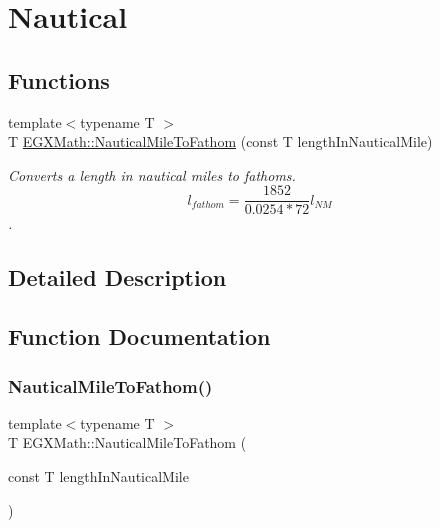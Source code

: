 \hypertarget{group___e_g_x_math-_conversions-_length_conversions-_nautical-_nautical_mile-_nautical}{}\section{Nautical}
\label{group___e_g_x_math-_conversions-_length_conversions-_nautical-_nautical_mile-_nautical}
\subsection*{Functions}
\begin{DoxyCompactItemize}
\item 
{\footnotesize template$<$typename T $>$ }\\T \mbox{\hyperlink{group___e_g_x_math-_conversions-_length_conversions-_nautical-_nautical_mile-_nautical_ga637330d41d3e33c1cf81ebe03e538bb3}{E\+G\+X\+Math\+::\+Nautical\+Mile\+To\+Fathom}} (const T length\+In\+Nautical\+Mile)
\begin{DoxyCompactList}\small\item\em Converts a length in nautical miles to fathoms. \[ l_{fathom}= \frac{1852}{0.0254 * 72} l_{NM} \]. \end{DoxyCompactList}\end{DoxyCompactItemize}


\subsection{Detailed Description}


\subsection{Function Documentation}
\mbox{\label{group___e_g_x_math-_conversions-_length_conversions-_nautical-_nautical_mile-_nautical_ga637330d41d3e33c1cf81ebe03e538bb3}} 
\subsubsection{\texorpdfstring{Nautical\+Mile\+To\+Fathom()}{NauticalMileToFathom()}}
{\footnotesize\ttfamily template$<$typename T $>$ \\
T E\+G\+X\+Math\+::\+Nautical\+Mile\+To\+Fathom (\begin{DoxyParamCaption}\item[{const T}]{length\+In\+Nautical\+Mile }\end{DoxyParamCaption})}



